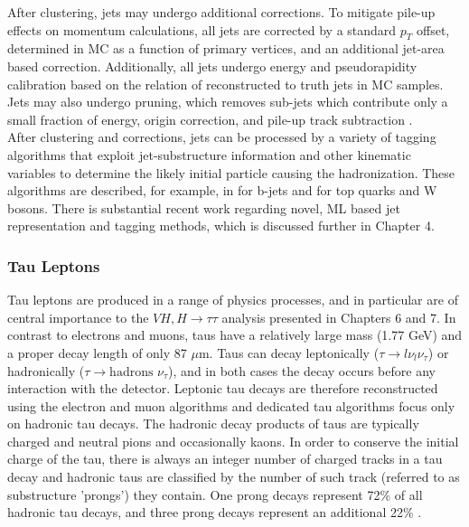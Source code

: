 After clustering, jets may undergo additional corrections. To mitigate pile-up effects on momentum calculations, all jets are corrected by a standard $p_T$ offset, determined in MC as a function of primary vertices, and an additional jet-area based correction. Additionally, all jets undergo energy and pseudorapidity calibration based on the relation of reconstructed to truth jets in MC samples. Jets may also undergo pruning, which removes sub-jets which contribute only a small fraction of energy, origin correction, and pile-up track subtraction \cite{jet_et_paper}.\\

After clustering and corrections, jets can be processed by a variety of tagging algorithms that exploit jet-substructure information and other kinematic variables to determine the likely initial particle causing the hadronization. These algorithms are described, for example, in \cite{b_tagging} for b-jets and \cite{w_top_tagging} for top quarks and W bosons. There is substantial recent work regarding novel, ML based jet representation and tagging methods, which is discussed further in Chapter 4.\\

\subsubsection{Tau Leptons}
Tau leptons are produced in a range of physics processes, and in particular are of central importance to the $VH,H\rightarrow\tau\tau$ analysis presented in Chapters 6 and 7. In contrast to electrons and muons, taus have a relatively large mass (1.77 GeV) and a proper decay length of only 87 $\mu$m. Taus can decay leptonically ($\tau\rightarrow l\nu_l\nu_{\tau}$) or hadronically ($\tau\rightarrow \text{hadrons }\nu_{\tau}$), and in both cases the decay occurs before any interaction with the detector. Leptonic tau decays are therefore reconstructed using the electron and muon algorithms and dedicated tau algorithms focus only on hadronic tau decays. The hadronic decay products of taus are typically charged and neutral pions and occasionally kaons. In order to conserve the initial charge of the tau, there is always an integer number of charged tracks in a tau decay and hadronic taus are classified by the number of such track (referred to as substructure 'prongs') they contain. One prong decays represent 72\% of all hadronic tau decays, and three prong decays represent an additional 22\% \cite{pdg}.\\

